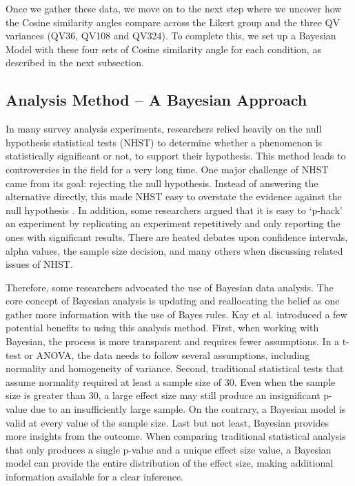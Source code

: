Once we gather these data, we move on to the next step where we uncover how the Cosine similarity angles compare across the Likert group and the three QV variances (QV36, QV108 and QV324). To complete this,
we set up a Bayesian Model with these four sets of Cosine similarity angle for each condition, as described in the next subsection.

\subsection{Analysis Method -- A Bayesian Approach}
\label{exp1:The Bayesian Model}


In many survey analysis experiments, researchers relied heavily on the null hypothesis statistical tests (NHST) to determine whether a phenomenon is statistically significant or not, to support their hypothesis. This method leads to controversies in the field for a very long time. One major challenge of NHST came from its goal: rejecting the null hypothesis. Instead of answering the alternative directly, this made NHST easy to overstate the evidence against the null hypothesis \cite{david2000NHST}. In addition, some researchers \cite{kruschke2010bayesian} argued that it is easy to `p-hack' an experiment by replicating an experiment repetitively and only reporting the ones with significant results. There are heated debates upon confidence intervals, alpha values, the sample size decision, and many others when discussing related issues of NHST.

Therefore, some researchers advocated the use of Bayesian data analysis. The core concept of Bayesian analysis is updating and reallocating the belief as one gather more information with the use of Bayes rules. Kay et al. \cite{kay2016researcher} introduced a few potential benefits to using this analysis method. First, when working with Bayesian, the process is more transparent and requires fewer assumptions. In a t-test or ANOVA, the data needs to follow several assumptions, including normality and homogeneity of variance. Second, traditional statistical tests that assume normality required at least a sample size of 30. Even when the sample size is greater than 30, a large effect size may still produce an insignificant p-value due to an insufficiently large sample. On the contrary, a Bayesian model is valid at every value of the sample size. Last but not least, Bayesian provides more insights from the outcome. When comparing traditional statistical analysis that only produces a single p-value and a unique effect size value, a Bayesian model can provide the entire distribution of the effect size, making additional information available for a clear inference.


